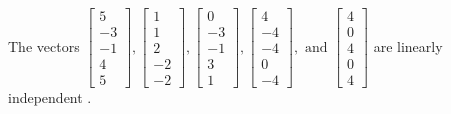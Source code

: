 \begin{exercise}
\begin{exerciseStatement}
  \end{exerciseStatement}
  \begin{exerciseAnswer}
   The vectors \(\left[\begin{array}{r}
5 \\
-3 \\
-1 \\
4 \\
5
\end{array}\right] , \left[\begin{array}{r}
1 \\
1 \\
2 \\
-2 \\
-2
\end{array}\right] , \left[\begin{array}{r}
0 \\
-3 \\
-1 \\
3 \\
1
\end{array}\right] , \left[\begin{array}{r}
4 \\
-4 \\
-4 \\
0 \\
-4
\end{array}\right] , \text{ and } \left[\begin{array}{r}
4 \\
0 \\
4 \\
0 \\
4
\end{array}\right]\) are 
  	 linearly independent  .
  


  \end{exerciseAnswer}
\end{exercise}